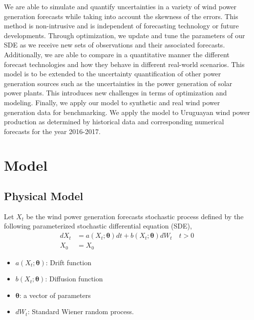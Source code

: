 \documentclass[10pt,twocolumn,letterpaper]{article}
\begin{document}
    We are able to simulate and quantify uncertainties in a variety of wind power generation forecasts while taking into account the skewness of the errors. This method is non-intrusive and is independent of forecasting technology or future developments. Through optimization, we update and tune the parameters of our SDE as we receive new sets of observations and their associated forecasts. Additionally, we are able to compare in a quantitative manner the different forecast technologies and how they behave in different real-world scenarios. This model is to be extended to the uncertainty quantification of other power generation sources such as the uncertainties in the power generation of solar power plants. This introduces new challenges in terms of optimization and modeling. Finally, we apply our model to synthetic and real wind power generation data for benchmarking. We apply the model to Uruguayan wind power production as determined by historical data and corresponding numerical forecasts for the year 2016-2017.

\section{Model}


\subsection{Physical Model}

Let $X_t$ be the  wind power generation forecasts stochastic process defined by the  following parameterized stochastic differential equation (SDE), 
\begin{equation}
\begin{split}
dX_t &= a(X_t; \bm{\theta}) dt + b (X_t; \bm{\theta} ) dW_t \quad t > 0 \\
X_0 & = X_0
\end{split}\label{main}
\end{equation}


\begin{itemize}
\item $a(X_t; \bm{\theta})$: Drift function 
\item $b (X_t; \bm{\theta} )$: Diffusion function 
\item $\bm{\theta}$: a vector of parameters
\item $dW_t$: Standard Wiener random process.
\end{itemize}
\end{document}
